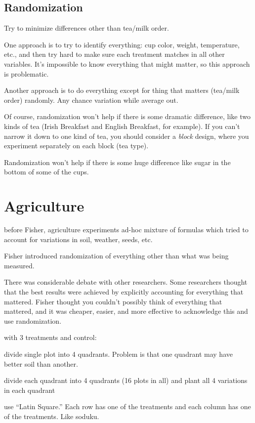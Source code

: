 \documentclass[landscape]{exam}
\begin{document}
  \subsection{Randomization}
  Try to minimize differences other than tea/milk order.

  One approach is to try to identify everything: cup color, weight, temperature,
  etc., and then try hard to make sure each treatment matches in all other
  variables.  It's impossible to know everything that might matter, so this
  approach is problematic.

  Another approach is to do everything except for thing that matters (tea/milk
  order) randomly.  Any chance variation while average out.

  Of course, randomization won't help if there is some dramatic difference, like
  two kinds of tea (Irish Breakfast and English Breakfast, for example).  If you
  can't narrow it down to one kind of tea, you should consider a {\em block\/}
  design, where you experiment separately on each block (tea type).

  Randomization won't help if there is some huge difference like sugar in the
  bottom of some of the cups.

  \section{Agriculture}
  \begin{itemize*}
    \item before Fisher, agriculture experiments ad-hoc mixture of formulas
      which tried to account for variations in soil, weather, seeds, etc.

    \item Fisher introduced randomization of everything other than what was
      being measured.

    \item There was considerable debate with other researchers.  Some
      researchers thought that the best results were achieved by explicitly
      accounting for everything that mattered.  Fisher thought you couldn't
      possibly think of everything that mattered, and it was cheaper, easier,
      and more effective to acknowledge this and use randomization.

    \item with 3 treatments and control:
      \begin{enumerate*}
        \item divide single plot into 4 quadrants.  Problem is that one quadrant
          may have better soil than another.
        \item divide each quadrant into 4 quadrants (16 plots in all) and plant
          all 4 variations in each quadrant
        \item use ``Latin Square.'' Each row has one of the treatments and each
          column has one of the treatments.  Like soduku.
      \end{enumerate*}
  \end{itemize*}
\end{document}
